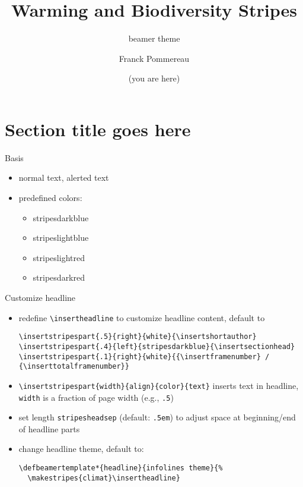 \documentclass[aspectratio=169]{beamer}
\begin{document}
\title{Warming and Biodiversity Stripes}
\subtitle{beamer theme}
\author{Franck Pommereau}
\date{\color{stripesdarkred}(you are here)}

\maketitle

\section{Section title goes here}

\begin{frame}[fragile]{Basis}
  \begin{itemize}
    \item normal text, \alert{alerted text}
    \item predefined colors:
    \begin{itemize}
      \item {\color{stripesdarkblue}stripesdarkblue}
      \item {\color{stripeslightblue}stripeslightblue}
      \item {\color{stripeslightred}stripeslightred}
      \item {\color{stripesdarkred}stripesdarkred}
    \end{itemize}
  \end{itemize}
\end{frame}

\begin{frame}[fragile]{Customize headline}
  \begin{itemize}
    \item redefine \Verb|\insertheadline| to customize headline content, default to
      \begin{Verbatim}[fontsize=\relsize{-2}]
\insertstripespart{.5}{right}{white}{\insertshortauthor}
\insertstripespart{.4}{left}{stripesdarkblue}{\insertsectionhead}
\insertstripespart{.1}{right}{white}{{\insertframenumber} / {\inserttotalframenumber}}
      \end{Verbatim}
    \item \Verb|\insertstripespart{width}{align}{color}{text}|
      inserts text in headline, \Verb|width| is a fraction of page width (e.g., \Verb|.5|)
    \item set length \Verb|stripesheadsep| (default: \texttt{.5em})
      to adjust space at beginning/end of headline parts
    \item change headline theme, default to:
      \begin{Verbatim}[fontsize=\relsize{-2}]
\defbeamertemplate*{headline}{infolines theme}{%
  \makestripes{climat}\insertheadline}
      \end{Verbatim}
  \end{itemize}
\end{frame}
\end{document}
